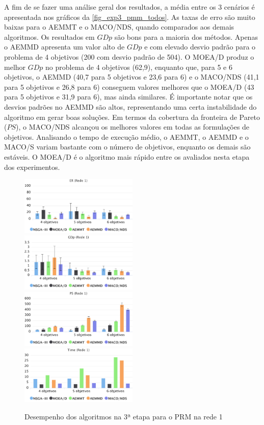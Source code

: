A fim de se fazer uma análise geral dos resultados, a média entre os 3 cenários é apresentada nos gráficos da \autoref{fig_exp3_pmm_todos}. As taxas de erro são muito baixas para o AEMMT e o MACO/NDS, quando comparados aos demais algoritmos. Os resultados em $GDp$ são bons para a maioria dos métodos. Apenas o AEMMD apresenta um valor alto de $GDp$ e com elevado desvio padrão para o problema de 4 objetivos (200 com desvio padrão de 504). O MOEA/D produz o melhor $GDp$ no problema de 4 objetivos (62,9), enquanto que, para 5 e 6 objetivos, o AEMMD (40,7 para 5 objetivos e 23,6 para 6) e o MACO/NDS (41,1 para 5 objetivos e 26,8 para 6) conseguem valores melhores que o MOEA/D (43 para 5 objetivos e 31,9 para 6), mas ainda similares. É importante notar que os desvios padrões no AEMMD são altos, representando uma certa instabilidade do algoritmo em gerar boas soluções. Em termos da cobertura da fronteira de Pareto ($PS$), o MACO/NDS alcançou os melhores valores em todas as formulações de objetivos. Analisando o tempo de execução médio, o AEMMT, o AEMMD e o MACO/S variam bastante com o número de objetivos, enquanto os demais são estáveis. O MOEA/D é o algoritmo mais rápido entre os avaliados nesta etapa dos experimentos.

\begin{figure}[!htbp]
	\includegraphics[width=0.5\textwidth]{cap_experimentos/figs/etapa3/er-mrp-r1}
	\includegraphics[width=0.5\textwidth]{cap_experimentos/figs/etapa3/gd-mrp-r1}
	\includegraphics[width=0.5\textwidth]{cap_experimentos/figs/etapa3/ps-mrp-r1}
	\includegraphics[width=0.5\textwidth]{cap_experimentos/figs/etapa3/time-mrp-r1}
	\caption{\label{fig_exp3_prm_r1}Desempenho dos algoritmos na 3ª etapa para o PRM na rede 1}
\end{figure}

